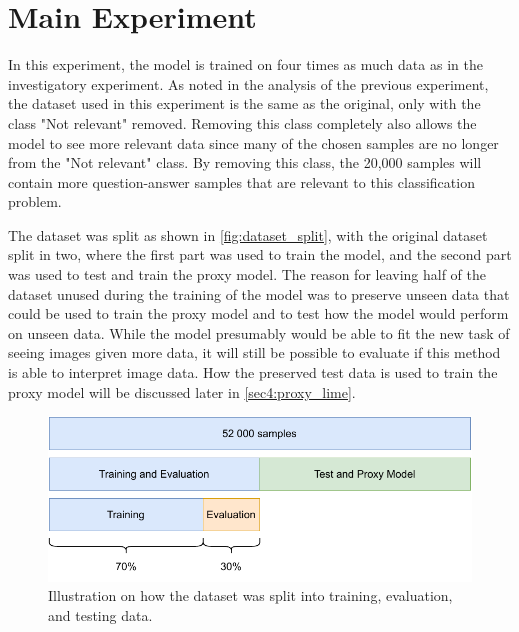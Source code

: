     \section{Main Experiment}

    In this experiment, the model is trained on four times as much data as in the investigatory experiment. 
    As noted in the analysis of the previous experiment, the dataset used in this experiment is the same as the original, only with the class "Not relevant" removed.
    Removing this class completely also allows the model to see more relevant data since many of the chosen samples are no longer from the "Not relevant" class. 
    By removing this class, the 20,000 samples will contain more question-answer samples that are relevant to this classification problem. 
    
    The dataset was split as shown in \autoref{fig:dataset_split}, with the original dataset split in two, where the first part was used to train the model, and the second part was used to test and train the proxy model. The reason for leaving half of the dataset unused during the training of the model was to preserve unseen data that could be used to train the proxy model and to test how the model would perform on unseen data. While the model presumably would be able to fit the new task of seeing images given more data, it will still be possible to evaluate if this method is able to interpret image data. How the preserved test data is used to train the proxy model will be discussed later in \autoref{sec4:proxy_lime}.


    \begin{figure}[htb]
        \centerline{
        \includegraphics[width=\textwidth]{images/datatset_split.pdf}}
        \caption[Illustration on how the dataset split into training, evaluation, and testing data.]{Illustration on how the dataset was split into training, evaluation, and testing data.}
        \label{fig:dataset_split}
    \end{figure} 
    
